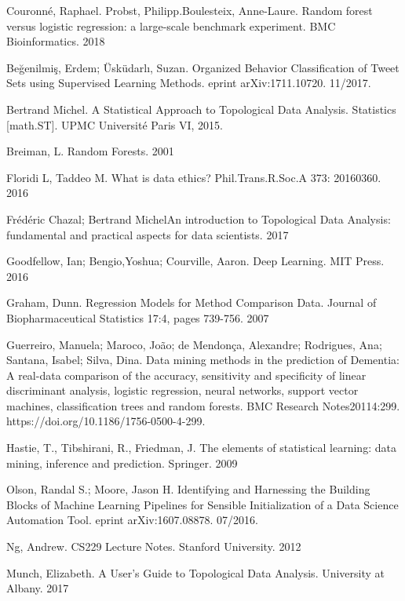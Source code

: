 \documentclass{llncs}
\begin{document}
\newpage
\begin{thebibliography}{18}

Couronné, Raphael. Probst, Philipp.Boulesteix, Anne-Laure. Random forest versus logistic regression: a large-scale benchmark experiment. BMC Bioinformatics. 2018

Beğenilmiş, Erdem; Üsküdarlı, Suzan.  Organized Behavior Classification of Tweet Sets using Supervised Learning Methods. eprint arXiv:1711.10720. 11/2017.

Bertrand Michel. A Statistical Approach to Topological Data Analysis. Statistics [math.ST]. UPMC Université Paris VI, 2015.

Breiman, L. Random Forests. 2001

Floridi L, Taddeo M.  What is data ethics? Phil.Trans.R.Soc.A 373: 20160360. 2016

Frédéric Chazal; Bertrand MichelAn introduction to Topological Data Analysis: fundamental and practical aspects for data scientists. 2017

Goodfellow, Ian; Bengio,Yoshua; Courville, Aaron. Deep Learning. MIT Press. 2016

Graham, Dunn. Regression Models for Method Comparison Data. Journal of Biopharmaceutical Statistics 17:4, pages 739-756. 2007

Guerreiro, Manuela; Maroco, João; de Mendonça, Alexandre; Rodrigues, Ana; Santana, Isabel; Silva, Dina. Data mining methods in the prediction of Dementia: A real-data comparison of the accuracy, sensitivity and specificity of linear discriminant analysis, logistic regression, neural networks, support vector machines, classification trees and random forests. BMC Research Notes20114:299. https://doi.org/10.1186/1756-0500-4-299.

Hastie, T., Tibshirani, R., Friedman, J. The elements of statistical learning: data mining, inference and prediction. Springer. 2009

Olson, Randal S.; Moore, Jason H.  Identifying and Harnessing the Building Blocks of Machine Learning Pipelines for Sensible Initialization of a Data Science Automation Tool. eprint arXiv:1607.08878. 07/2016. 

Ng, Andrew. CS229 Lecture Notes. Stanford University. 2012

Munch, Elizabeth. A User’s Guide to Topological Data Analysis. University at Albany. 2017


\end{thebibliography}
\end{document}
